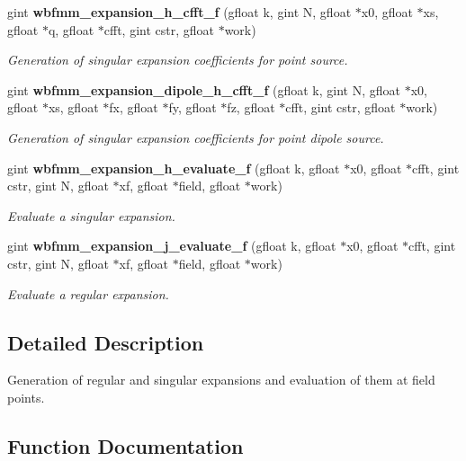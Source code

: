 \begin{DoxyCompactItemize}
gint {\bf wbfmm\+\_\+expansion\+\_\+h\+\_\+cfft\+\_\+f} (gfloat k, gint N, gfloat $\ast$x0, gfloat $\ast$xs, gfloat $\ast$q, gfloat $\ast$cfft, gint cstr, gfloat $\ast$work)
\begin{DoxyCompactList}\small\item\em Generation of singular expansion coefficients for point source. \end{DoxyCompactList}\item 
gint {\bf wbfmm\+\_\+expansion\+\_\+dipole\+\_\+h\+\_\+cfft\+\_\+f} (gfloat k, gint N, gfloat $\ast$x0, gfloat $\ast$xs, gfloat $\ast$fx, gfloat $\ast$fy, gfloat $\ast$fz, gfloat $\ast$cfft, gint cstr, gfloat $\ast$work)
\begin{DoxyCompactList}\small\item\em Generation of singular expansion coefficients for point dipole source. \end{DoxyCompactList}\item 
gint {\bf wbfmm\+\_\+expansion\+\_\+h\+\_\+evaluate\+\_\+f} (gfloat k, gfloat $\ast$x0, gfloat $\ast$cfft, gint cstr, gint N, gfloat $\ast$xf, gfloat $\ast$field, gfloat $\ast$work)
\begin{DoxyCompactList}\small\item\em Evaluate a singular expansion. \end{DoxyCompactList}\item 
gint {\bf wbfmm\+\_\+expansion\+\_\+j\+\_\+evaluate\+\_\+f} (gfloat k, gfloat $\ast$x0, gfloat $\ast$cfft, gint cstr, gint N, gfloat $\ast$xf, gfloat $\ast$field, gfloat $\ast$work)
\begin{DoxyCompactList}\small\item\em Evaluate a regular expansion. \end{DoxyCompactList}\end{DoxyCompactItemize}


\subsection{Detailed Description}
Generation of regular and singular expansions and evaluation of them at field points. 



\subsection{Function Documentation}
